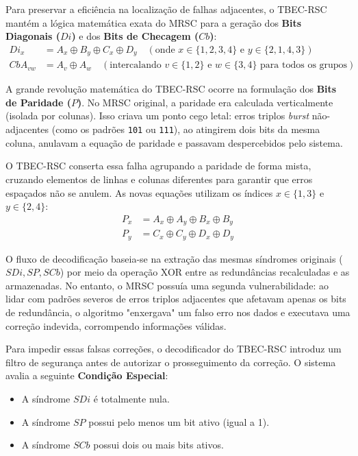 \documentclass[12pt,a4paper]{article}
\begin{document}
Para preservar a eficiência na localização de falhas adjacentes, o TBEC-RSC mantém a lógica matemática exata do MRSC para a geração dos \textbf{Bits Diagonais ($Di$)} e dos \textbf{Bits de Checagem ($Cb$)}:
\begin{align}
    Di_x &= A_x \oplus B_y \oplus C_x \oplus D_y \quad (\text{onde } x \in \{1,2,3,4\} \text{ e } y \in \{2,1,4,3\}) \\
    CbA_{vw} &= A_v \oplus A_w \quad (\text{intercalando } v \in \{1,2\} \text{ e } w \in \{3,4\} \text{ para todos os grupos})
\end{align}

A grande revolução matemática do TBEC-RSC ocorre na formulação dos \textbf{Bits de Paridade ($P$)}. No MRSC original, a paridade era calculada verticalmente (isolada por colunas). Isso criava um ponto cego letal: erros triplos \textit{burst} não-adjacentes (como os padrões \texttt{101} ou \texttt{111}), ao atingirem dois bits da mesma coluna, anulavam a equação de paridade e passavam despercebidos pelo sistema. 

O TBEC-RSC conserta essa falha agrupando a paridade de forma mista, cruzando elementos de linhas e colunas diferentes para garantir que erros espaçados não se anulem. As novas equações utilizam os índices $x \in \{1,3\}$ e $y \in \{2,4\}$:
\begin{align}
    P_x &= A_x \oplus A_y \oplus B_x \oplus B_y \\
    P_y &= C_x \oplus C_y \oplus D_x \oplus D_y
\end{align}

O fluxo de decodificação baseia-se na extração das mesmas síndromes originais ($SDi, SP, SCb$) por meio da operação XOR entre as redundâncias recalculadas e as armazenadas. No entanto, o MRSC possuía uma segunda vulnerabilidade: ao lidar com padrões severos de erros triplos adjacentes que afetavam apenas os bits de redundância, o algoritmo "enxergava" um falso erro nos dados e executava uma correção indevida, corrompendo informações válidas.

Para impedir essas falsas correções, o decodificador do TBEC-RSC introduz um filtro de segurança antes de autorizar o prosseguimento da correção. O sistema avalia a seguinte \textbf{Condição Especial}:

\begin{itemize}
    \item A síndrome $SDi$ é totalmente nula.
    \item A síndrome $SP$ possui pelo menos um bit ativo (igual a 1).
    \item A síndrome $SCb$ possui dois ou mais bits ativos.
\end{itemize}
\end{document}
